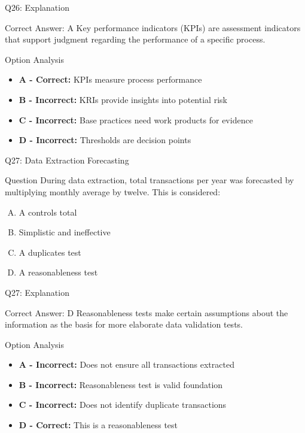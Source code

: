 \documentclass{beamer}
\begin{document}
	\begin{frame}{Q26: Explanation}
		\begin{block}{Correct Answer: A}
			Key performance indicators (KPIs) are assessment indicators that support judgment regarding the performance of a specific process.
		\end{block}
		\begin{block}{Option Analysis}
			\begin{itemize}
				\item \textbf{A - Correct:} KPIs measure process performance
				\item \textbf{B - Incorrect:} KRIs provide insights into potential risk
				\item \textbf{C - Incorrect:} Base practices need work products for evidence
				\item \textbf{D - Incorrect:} Thresholds are decision points
			\end{itemize}
		\end{block}
	\end{frame}
	
	\begin{frame}{Q27: Data Extraction Forecasting}
		\begin{block}{Question}
			During data extraction, total transactions per year was forecasted by multiplying monthly average by twelve. This is considered:
		\end{block}
		\begin{enumerate}[(A)]
			\item A controls total
			\item Simplistic and ineffective
			\item A duplicates test
			\item A reasonableness test
		\end{enumerate}
	\end{frame}
	
	\begin{frame}{Q27: Explanation}
		\begin{block}{Correct Answer: D}
			Reasonableness tests make certain assumptions about the information as the basis for more elaborate data validation tests.
		\end{block}
		\begin{block}{Option Analysis}
			\begin{itemize}
				\item \textbf{A - Incorrect:} Does not ensure all transactions extracted
				\item \textbf{B - Incorrect:} Reasonableness test is valid foundation
				\item \textbf{C - Incorrect:} Does not identify duplicate transactions
				\item \textbf{D - Correct:} This is a reasonableness test
			\end{itemize}
		\end{block}
	\end{frame}
	
\end{document}
